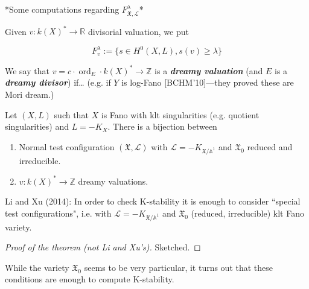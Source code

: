 *Some computations regarding
$F^\lambda_{\mathfrak{X},\mathcal{L}}$*

\begin{definition}
\label{definition-montero-4}
Given $v: k(X)^* \longrightarrow\mathbb{R}$
divisorial valuation, we put

$$
F^\lambda_v:=\{s \in H^{0}(X,L),s(v) \geq
\lambda\}
$$

\end{definition}

\begin{definition}[K. Fujta '16]
\label{definition-montero-5}
We say that $v=c\cdot
\operatorname{ord}_E\cdot k(X)^*
\longrightarrow \mathbb{Z}$ is a
\textit{\textbf{dreamy valuation}} (and $E$
is a \textit{\textbf{dreamy divisor}})
if\ldots{} (e.g. if $Y$ is log-Fano
[BCHM'10]---they proved these are Mori
dream.)
\end{definition}

\begin{theorem}
\label{theorem-montero-5}
Let $(X,L)$ such that $X$ is Fano with klt
singularities (e.g. quotient singularities)
and $L=-K_X$. There is a bijection between
\begin{enumerate}
\item Normal test configuration
$(\mathfrak{X},\mathcal{L})$ with
$\mathcal{L}=-K_{\mathfrak{X}/\mathbb{A}^1}$
and $\mathfrak{X}_0$ reduced and irreducible.
\item $v:k(X)^* \longrightarrow \mathbb{Z}$
dreamy valuations.
\end{enumerate}
\end{theorem}

\medskip\noindent{\bf !}
Li and Xu (2014): In order to check
K-stability it is enough to consider
``special test configurations", i.e. with
$\mathcal{L}=-K_{\mathfrak{X}/\mathbb{A}^1}$
and $\mathfrak{X}_0$ (reduced, irreducible)
klt Fano variety.

\begin{proof}[Proof of the theorem (not Li
and Xu's)]
Sketched.
\end{proof}

\begin{remark}
\label{remark-montero-6}
While the variety $\mathfrak{X}_0$ seems to
be very particular, it turns out that these
conditions are enough to compute K-stability.
\end{remark}

\medskip{}

\medskip{}

